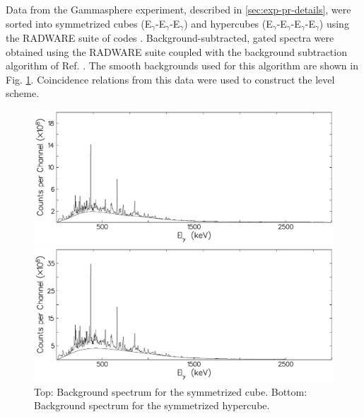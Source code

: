 Data from the Gammasphere experiment, described in \ref{sec:exp-pr-details}, were sorted into symmetrized cubes (E$_{\gamma{}}$-E$_{\gamma{}}$-E$_{\gamma{}}$) and hypercubes (E$_{\gamma{}}$-E$_{\gamma{}}$-E$_{\gamma{}}$-E$_{\gamma{}}$) using the RADWARE suite of codes \cite{radware}. Background-subtracted, gated spectra were obtained using the RADWARE suite coupled with the background subtraction algorithm of Ref. \cite{symBGSub}. The smooth backgrounds used for this algorithm are shown in Fig. \ref{fig:chp4-bg-specs}. Coincidence relations from this data were used to construct the level scheme.
\begin{figure}[ht!]
\centerline{\includegraphics[width=\textwidth]{./img/c4/trips_bg.pdf}}
\centerline{\includegraphics[width=\textwidth]{./img/c4/quads_bg.pdf}}
	\caption{Top: Background spectrum for the symmetrized cube. Bottom: Background spectrum for the symmetrized hypercube. \label{fig:chp4-bg-specs}}
\end{figure}

